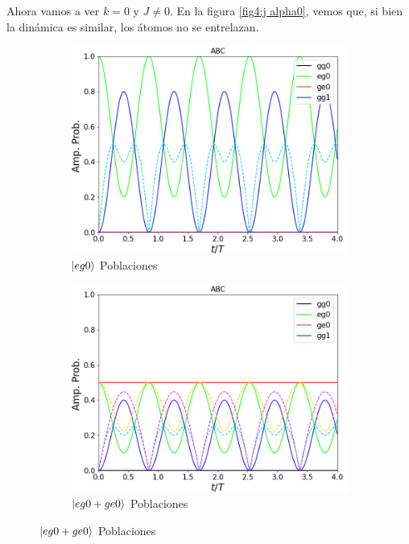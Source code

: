 Ahora vamos a ver $k=0$ y $J\neq 0$. En la figura \ref{fig4:j alpha0}, vemos que, si bien la dinámica es similar, los átomos no se entrelazan.

\begin{figure}[H]
    \centering
    \begin{subfigure}{0.49\textwidth}
        \includegraphics[width=\textwidth]{figuras/ch4/j eg0 abc.png}
        \caption{$\ket{eg0}$ Poblaciones}
        \label{fig4:pob j eg0}
    \end{subfigure}
    \hfill
    \begin{subfigure}{0.49\textwidth}
        \includegraphics[width=\textwidth]{figuras/ch4/j eg0+ge0 abc.png}
        \caption{$\ket{eg0+ge0}$ Poblaciones}

\end{subfigure}
\end{figure}
